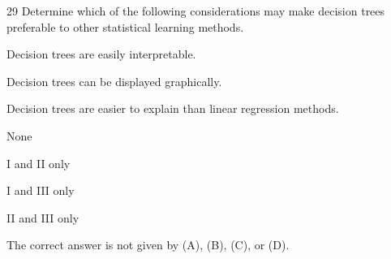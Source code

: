 \begin{question}{29}
Determine which of the following considerations may make decision trees preferable to other statistical learning methods.
\begin{statements}
\item Decision trees are easily interpretable.
\item Decision trees can be displayed graphically.
\item Decision trees are easier to explain than linear regression methods.
\end{statements}

\begin{choices}
\item None
\item I and II only
\item I and III only
\item II and III only
\item The correct answer is not given by (A), (B), (C), or (D).
\end{choices}
\end{question}

